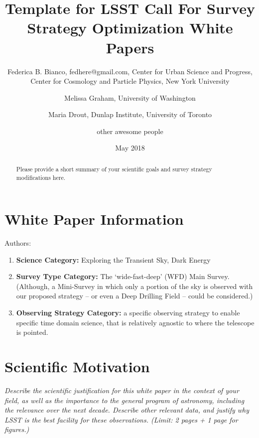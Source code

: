 \documentclass[11pt]{article}
\title{Template for LSST Call For Survey Strategy Optimization White Papers}
\author{}
\date{May 2018}
\begin{document}
\maketitle

\begin{abstract}

Please provide a short summary of your scientific goals and survey strategy modifications here.
\end{abstract}

\section{White Paper Information}
Authors: 

\noindent
\author{Federica B. Bianco, fedhere@gmail.com, Center for Urban Science and Progress, Center for Cosmology and Particle Physics, New York University }

\noindent
\author{Melissa Graham, University of Washington}

\noindent
\author{Maria Drout, Dunlap Institute, University of Toronto}

\noindent
\author{other awesome people}

\begin{enumerate} 
\item {\bf Science Category:} Exploring the Transient Sky, Dark Energy
\item {\bf Survey Type Category:} 
The `wide-fast-deep' (WFD) Main Survey. (Although, a Mini-Survey in which only a portion of the sky is observed with our proposed strategy -- or even a Deep Drilling Field --  could be considered.) 
\item {\bf Observing Strategy Category:} 
   a specific observing strategy to enable specific time domain science, that is relatively agnostic to where the telescope is pointed. 
\end{enumerate}  


\clearpage
\section{Scientific Motivation}
\begin{footnotesize}
{\it Describe the scientific justification for this white paper in the context of your field, as well as the importance to the general program of astronomy, including the relevance over the next decade. Describe other relevant data, and justify why LSST is the best facility for these observations. (Limit: 2 pages + 1 page for figures.)}
\end{footnotesize}
\end{document}
